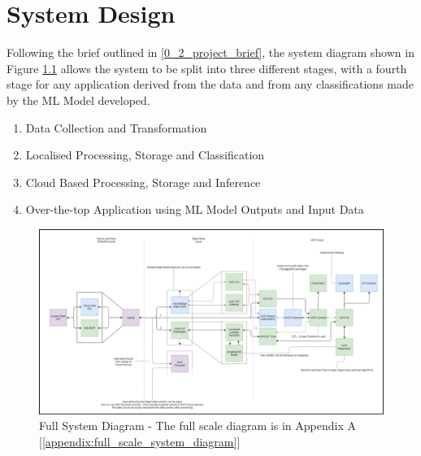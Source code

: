 \chapter{System Design} \label{Chapter:System Design}
Following the brief outlined in \ref{0_2_project_brief}, the system diagram shown in Figure \ref{fig_system_diagram_full} allows the system to be split into three different stages, with a fourth stage for any application derived from the data and from any classifications made by the ML Model developed. 
\begin{enumerate}
    \item Data Collection and Transformation
    \item Localised Processing, Storage and Classification
    \item Cloud Based Processing, Storage and Inference
    \item Over-the-top Application using ML Model Outputs and Input Data
\end{enumerate}



\begin{figure}[ht]
    \label{fig_system_diagram_full}
    \centering
    \includegraphics[width=1\linewidth]{pages/Chapter3/Chapter 3 images/block_system_diagram_v2.png}
    \caption{Full System Diagram - The full scale diagram is in Appendix A [\ref{appendix:full_scale_system_diagram}]}
\end{figure}

